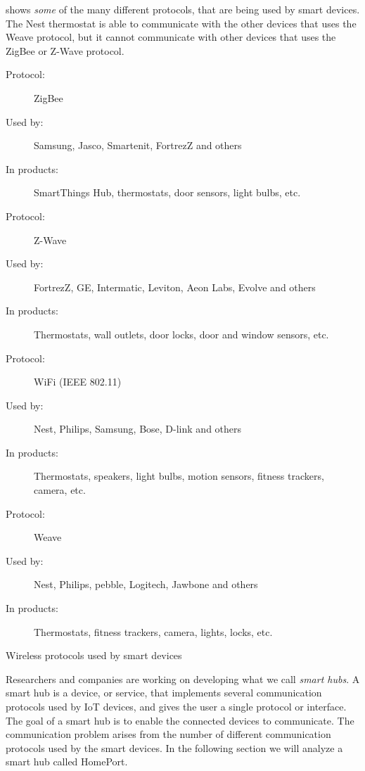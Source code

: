  shows \emph{some} of the many different protocols, 
that are being used by smart devices. 
The Nest thermostat is able to communicate with the other devices that uses the Weave protocol, 
but it cannot communicate with other devices that uses \eg the ZigBee or Z-Wave protocol. 

\begin{table}[!htb]
  \begin{description}
    \item[Protocol:] ZigBee
    \item[Used by:] Samsung, Jasco, Smartenit, FortrezZ and others
    \item[In products:] SmartThings Hub, thermostats, door sensors, light bulbs, etc.\\
    
    \item[Protocol:] Z-Wave
    \item[Used by:] FortrezZ, GE, Intermatic, Leviton, Aeon Labs, Evolve and others
    \item[In products:] Thermostats, wall outlets, door locks, door and window sensors, etc.  \\
    
    \item[Protocol:] WiFi (IEEE 802.11)
    \item[Used by:] Nest, Philips, Samsung, Bose, D-link and others
    \item[In products:] Thermostats, speakers, light bulbs, motion sensors, fitness trackers, camera, etc. \\
    
    \item[Protocol:] Weave
    \item[Used by:] Nest, Philips, pebble, Logitech, Jawbone and others
    \item[In products:] Thermostats, fitness trackers, camera, lights, locks, etc. 
  \end{description}
  \caption{Wireless protocols used by smart devices}\label{table:iotprotocols}
\end{table}

Researchers and companies are working on developing what we call \emph{smart hubs}. 
A smart hub is a device, or service, 
that implements several communication protocols used by IoT devices, 
and gives the user a single protocol or interface. 
The goal of a smart hub is to enable the connected devices to communicate.
The communication problem arises from the number of different communication protocols used by the smart devices. 
In the following section we will analyze a smart hub called HomePort. 

